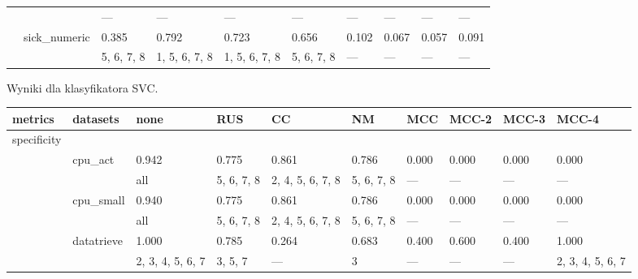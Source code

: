 \documentclass{article}
\begin{document}
\begin{center}
\begin{longtable}{p{1.2cm}p{1.8cm}p{1cm}p{1cm}p{1cm}p{1cm}p{1cm}p{1cm}p{1cm}p{1cm}}
             &              & ---              & ---           & ---           & ---           & ---           & ---        & ---              & ---           \\
             & sick\_numeric & 0.385            & 0.792         & 0.723         & 0.656         & 0.102         & 0.067      & 0.057            & 0.091         \\
             &              & 5, 6, 7, 8       & 1, 5, 6, 7, 8 & 1, 5, 6, 7, 8 & 5, 6, 7, 8    & ---           & ---        & ---              & ---           \\
\hline
\end{longtable}
\end{center}


\newpage
\begin{center}
\caption{Wyniki dla klasyfikatora SVC.}\label{tab:my_label_SVC}
\begin{longtable}{p{1.2cm}p{1.8cm}p{1cm}p{1cm}p{1cm}p{1cm}p{1cm}p{1cm}p{1cm}p{1cm}}
\hline
 metrics     & datasets     & none             & RUS              & CC               & NM               & MCC        & MCC-2         & MCC-3         & MCC-4         \\
\hline
\endhead
 specificity &              &                  &                  &                  &                  &                  &                  &                  &                  \\
             & cpu\_act      & 0.942            & 0.775            & 0.861            & 0.786            & 0.000            & 0.000            & 0.000            & 0.000            \\
             &              & all              & 5, 6, 7, 8       & 2, 4, 5, 6, 7, 8 & 5, 6, 7, 8       & ---              & ---              & ---              & ---              \\
             & cpu\_small    & 0.940            & 0.775            & 0.861            & 0.786            & 0.000            & 0.000            & 0.000            & 0.000            \\
             &              & all              & 5, 6, 7, 8       & 2, 4, 5, 6, 7, 8 & 5, 6, 7, 8       & ---              & ---              & ---              & ---              \\
             & datatrieve   & 1.000            & 0.785            & 0.264            & 0.683            & 0.400            & 0.600            & 0.400            & 1.000            \\
             &              & 2, 3, 4, 5, 6, 7 & 3, 5, 7          & ---              & 3                & ---              & ---              & ---              & 2, 3, 4, 5, 6, 7 \\

\end{longtable}
\end{center}
\end{document}
